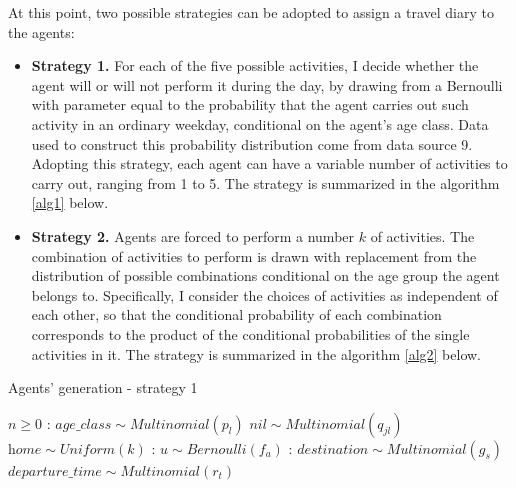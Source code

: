 At this point, two possible strategies can be adopted to assign a travel diary to the agents:
\begin{itemize}
    \item \textbf{Strategy 1.} For each of the five possible activities, I decide whether the agent will or will not perform it during the day, by drawing from a Bernoulli with parameter equal to the probability that the agent carries out such activity in an ordinary weekday, conditional on the agent's age class. Data used to construct this probability distribution come from data source 9. Adopting this strategy, each agent can have a variable number of activities to carry out, ranging from 1 to 5. The strategy is summarized in the algorithm \ref{alg1} below.
    \item \textbf{Strategy 2.} Agents are forced to perform a number $k$ of activities. The combination of activities to perform is drawn with replacement from the distribution of possible combinations conditional on the age group the agent belongs to. Specifically, I consider the choices of activities as independent of each other, so that the conditional probability of each combination corresponds to the product of the conditional probabilities of the single activities in it. The strategy is summarized in the algorithm \ref{alg2} below.
\end{itemize}

\pagebreak
\begin{algorithm}[H]
\caption{Agents' generation - strategy 1}\label{alg1}
\begin{algorithmic}
\Require $n \geq 0$
:
\State $\textit{age\_class} \sim Multinomial(p_l)$ 
\State $\textit{nil} \sim Multinomial(q_{jl})$ 
\State $\textit{home} \sim Uniform(k)$ 
:
\State $ \textit{u} \sim Bernoulli(f_a)$ 
:
    \State $\textit{destination} \sim Multinomial(g_s)$ \\
    \State $\textit{departure\_time} \sim Multinomial(r_t)$ \\
\EndIf
\EndFor
\EndFor
\end{algorithmic}
\end{algorithm}

